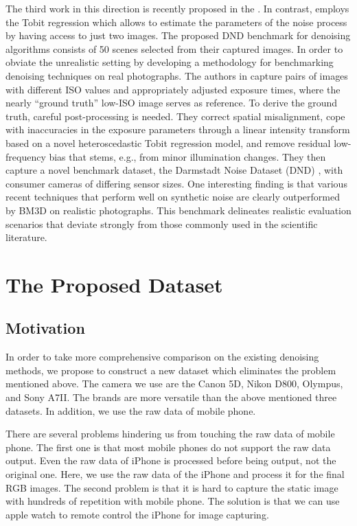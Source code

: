 The third work in this direction is recently proposed in the \cite{dnd2017}. In contrast, \cite{dnd2017} employs the Tobit regression which allows to estimate the parameters of the noise process by having access to just two images. The proposed DND benchmark for denoising algorithms consists of 50 scenes selected from their captured images. In order to obviate the unrealistic setting by developing a methodology for benchmarking denoising techniques on real photographs. The authors in \cite{dnd2017} capture pairs of images with different ISO values and appropriately adjusted exposure times, where the nearly ``ground truth'' low-ISO image serves as reference. To derive the ground truth, careful post-processing is needed. They correct spatial misalignment, cope with inaccuracies in the exposure parameters through a linear intensity transform based on a novel heteroscedastic Tobit regression model, and remove residual low-frequency bias that stems, e.g., from minor illumination changes. They then capture a novel benchmark dataset, the Darmstadt Noise Dataset (DND) \cite{dnd2017}, with consumer cameras of differing sensor sizes. One interesting finding is that various recent techniques that perform well on synthetic noise are clearly outperformed by BM3D \cite{bm3d} on realistic photographs. This benchmark delineates realistic evaluation scenarios that deviate strongly from those commonly used in the scientific literature.


\section{The Proposed Dataset}

\subsection{Motivation}

In order to take more comprehensive comparison on the existing denoising methods, we propose to construct a new dataset which eliminates the problem mentioned above. The camera we use are the Canon 5D, Nikon D800, Olympus, and Sony A7II. The brands are more versatile than the above mentioned three datasets. In addition, we use the raw data of mobile phone. 

There are several problems hindering us from touching the raw data of mobile phone. The first one is that most mobile phones do not support the raw data output. Even the raw data of  iPhone is processed before being output, not the original one. Here, we use the raw data of the iPhone and process it for the final RGB images. The second problem is that it is hard to capture the static image with hundreds of repetition with mobile phone. The solution is that we can use apple watch to remote control the iPhone for image capturing. 

